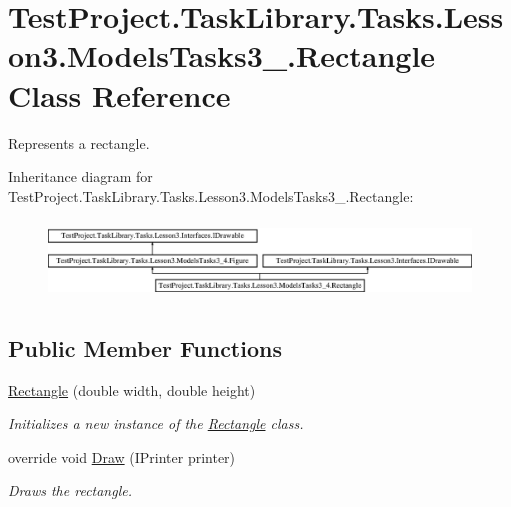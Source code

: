 \hypertarget{class_test_project_1_1_task_library_1_1_tasks_1_1_lesson3_1_1_models_tasks3__4_1_1_rectangle}{}\section{Test\+Project.\+Task\+Library.\+Tasks.\+Lesson3.\+Models\+Tasks3\+\_.\+Rectangle Class Reference}
\label{class_test_project_1_1_task_library_1_1_tasks_1_1_lesson3_1_1_models_tasks3__4_1_1_rectangle}


Represents a rectangle.  


Inheritance diagram for Test\+Project.\+Task\+Library.\+Tasks.\+Lesson3.\+Models\+Tasks3\+\_.\+Rectangle\+:\begin{figure}[H]
\begin{center}
\leavevmode
\includegraphics[height=2.105263cm]{class_test_project_1_1_task_library_1_1_tasks_1_1_lesson3_1_1_models_tasks3__4_1_1_rectangle}
\end{center}
\end{figure}
\subsection*{Public Member Functions}
\begin{DoxyCompactItemize}
\item 
\mbox{\hyperlink{class_test_project_1_1_task_library_1_1_tasks_1_1_lesson3_1_1_models_tasks3__4_1_1_rectangle_ac0b6acccad1e2fce63f4cc0a3e3bbae8}{Rectangle}} (double width, double height)
\begin{DoxyCompactList}\small\item\em Initializes a new instance of the \mbox{\hyperlink{class_test_project_1_1_task_library_1_1_tasks_1_1_lesson3_1_1_models_tasks3__4_1_1_rectangle}{Rectangle}} class. \end{DoxyCompactList}\item 
override void \mbox{\hyperlink{class_test_project_1_1_task_library_1_1_tasks_1_1_lesson3_1_1_models_tasks3__4_1_1_rectangle_a907edce9a5bc56a45b69cae79d9d5322}{Draw}} (I\+Printer printer)
\begin{DoxyCompactList}\small\item\em Draws the rectangle. \end{DoxyCompactList}\end{DoxyCompactItemize}
